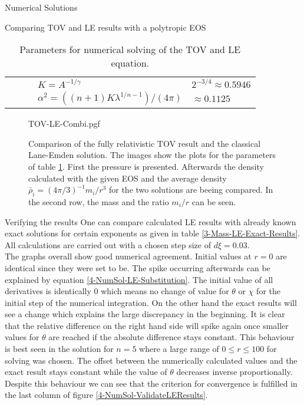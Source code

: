 \begin{section}{Numerical Solutions}
\begin{subsection}{Comparing TOV and LE results with a polytropic EOS}
\begin{table}[H]
\begin{tabular}{@{}llcll@{}}
		&&& $K=A^{-1/\gamma}$ & $2^{-3/4}\approx0.5946$\\
		&&& $\alpha^2=((n+1)K\lambda^{1/n-1})/(4\pi)$ & $\approx0.1125$\\
		\bottomrule
	\end{tabular}
	\caption[Numerical Parameters for TOV and LE equation]{Parameters for numerical solving of the \ac{TOV} and \ac{LE} equation.}
	\label{4-NumSol-TOVParameters}
\end{table}%
\begin{figure}[H]
	\centering
	{TOV-LE-Combi.pgf}
	\caption[Comparison TOV and LE equation]{Comparison of the fully relativistic \ac{TOV} result and the classical Lane-Emden solution. The images show the plots for the parameters of table \ref{4-NumSol-TOVParameters}. First the pressure is presented. Afterwards the density calculated with the given EOS and the average density $\bar{\rho}_i=(4\pi/3)^{-1}m_i/r^3$ for the two solutions are beeing compared. In the second row, the mass and the ratio $m_i/r$ can be seen.}
	\label{4-NumSol-TOVEqEasyEOS}
\end{figure}
\end{subsection}
%
%
\begin{subsection}{Verifying the results}
\label{4-NumSol-Sec-Verifiying-the-results}
One can compare calculated \ac{LE} results with already known exact  solutions for certain exponents as given in table \ref{3-Mass-LE-Exact-Results}. 
All calculations are carried out with a chosen step size of $d\xi=0.03$.\\
The graphs overall show good numerical agreement. 
Initial values at $r=0$ are identical since they were set to be. 
The spike occurring afterwards can be explained by equation \eqref{4-NumSol-LE-Substitution}. 
The initial value of all derivatives is identically $0$ which means no change of value for $\theta$ or $\chi$ for the initial step of the numerical integration. 
On the other hand the exact results will see a change which explains the large discrepancy in the beginning.
It is clear that the relative difference on the right hand side will spike again once smaller values for $\theta$ are reached if the absolute difference stays constant. 
This behaviour is best seen in the solution for $n=5$ where a large range of $0\leq r\leq100$ for solving was chosen. 
The offset between the numerically calculated values and the exact result stays constant while the value of $\theta$ decreases inverse proportionally.
Despite this behaviour we can see that the criterion for convergence is fulfilled in the last column of figure \ref{4-NumSol-ValidateLEResults}.

\end{subsection}
\end{section}
